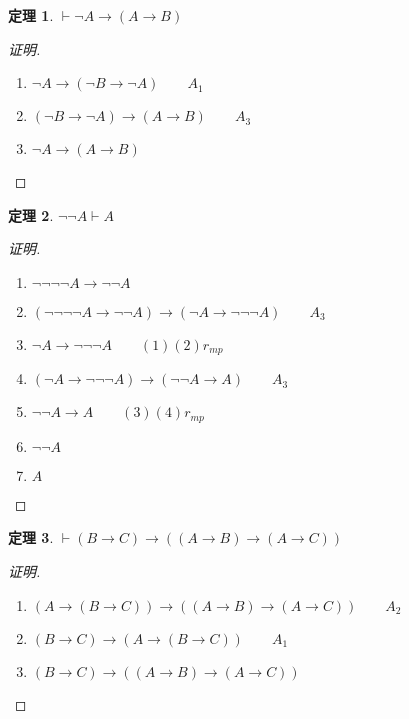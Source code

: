 \documentclass{article}
\newtheorem{Thm}{定理}
\begin{document}
\begin{CJK*}{UTF8}{gbsn}
  \begin{Thm}$\vdash \lnot A\to (A\to B)$
  \end{Thm}
  \begin{proof}[证明]$\quad$
    \begin{enumerate}
      \item $ \lnot A \to (\lnot B \to \lnot A) \quad\quad A_1$ 
      \item $ (\lnot B \to \lnot A)\to (A\to B)\quad\quad A_3$
      \item  $\lnot A \to (A\to B)$ 
    \end{enumerate}
  \end{proof}

  \begin{Thm}$\lnot \lnot A\vdash A$\end{Thm}
  \begin{proof}[证明]$\quad$
    \begin{enumerate}
      \item $\lnot \lnot \lnot \lnot A \to \lnot \lnot A$
      \item $(\lnot \lnot \lnot \lnot A \to \lnot \lnot A) \to ( \lnot A \to \lnot \lnot \lnot A) \quad \quad A_3$
      \item $ \lnot A \to \lnot \lnot \lnot A \quad\quad (1)(2)r_{mp}$
      \item  $( \lnot A \to \lnot \lnot \lnot A)\to (\lnot \lnot A \to A) \quad \quad A_3$
      \item $\lnot \lnot A \to A \quad\quad (3)(4)r_{mp}$
      \item $\lnot \lnot A$
      \item $A$
    \end{enumerate}
  \end{proof}

  \begin{Thm}$\vdash(B\to C)\to ((A\to B)\to (A\to C))$\end{Thm}
  \begin{proof}[证明]$\quad$
    \begin{enumerate}
      \item $(A\to (B\to C)) \to ((A\to B)\to (A\to C)) \quad\quad A_2$
      \item $(B\to C) \to (A\to (B\to C)) \quad\quad A_1$
      \item $(B\to C)\to ((A\to B)\to (A\to C))$
    \end{enumerate}
  \end{proof}


\end{CJK*}
\end{document}
